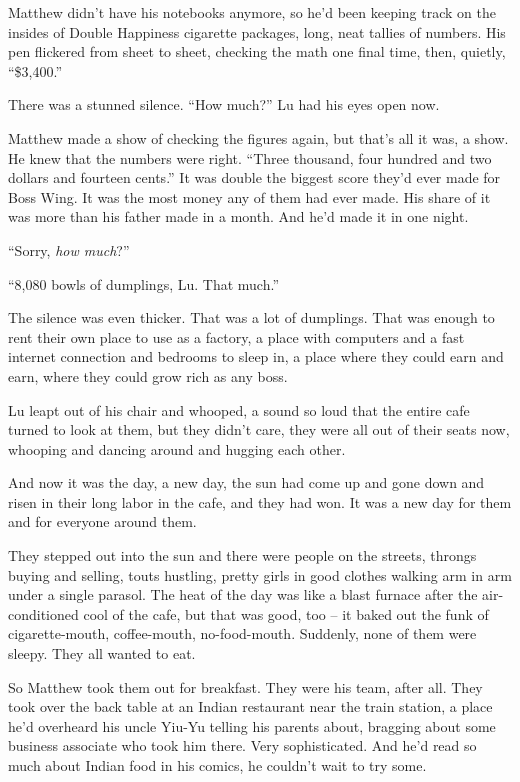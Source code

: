 Matthew didn't have his notebooks anymore, so he'd been keeping
track on the insides of Double Happiness cigarette packages, long,
neat tallies of numbers. His pen flickered from sheet to sheet,
checking the math one final time, then, quietly, ``\$3,400.''

There was a stunned silence. ``How much?'' Lu had his eyes open now.

Matthew made a show of checking the figures again, but that's all
it was, a show. He knew that the numbers were right. ``Three
thousand, four hundred and two dollars and fourteen cents.'' It was
double the biggest score they'd ever made for Boss Wing. It was the
most money any of them had ever made. His share of it was more than
his father made in a month. And he'd made it in one night.

``Sorry, \emph{how much}?''

``8,080 bowls of dumplings, Lu. That much.''

The silence was even thicker. That was a lot of dumplings. That was
enough to rent their own place to use as a factory, a place with
computers and a fast internet connection and bedrooms to sleep in,
a place where they could earn and earn, where they could grow rich
as any boss.

Lu leapt out of his chair and whooped, a sound so loud that the
entire cafe turned to look at them, but they didn't care, they were
all out of their seats now, whooping and dancing around and hugging
each other.

And now it was the day, a new day, the sun had come up and gone
down and risen in their long labor in the cafe, and they had won.
It was a new day for them and for everyone around them.

They stepped out into the sun and there were people on the streets,
throngs buying and selling, touts hustling, pretty girls in good
clothes walking arm in arm under a single parasol. The heat of the
day was like a blast furnace after the air-conditioned cool of the
cafe, but that was good, too -- it baked out the funk of
cigarette-mouth, coffee-mouth, no-food-mouth. Suddenly, none of
them were sleepy. They all wanted to eat.

So Matthew took them out for breakfast. They were his team, after
all. They took over the back table at an Indian restaurant near the
train station, a place he'd overheard his uncle Yiu-Yu telling his
parents about, bragging about some business associate who took him
there. Very sophisticated. And he'd read so much about Indian food
in his comics, he couldn't wait to try some.

